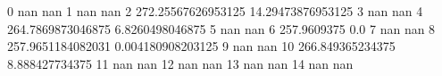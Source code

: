 0 nan nan
1 nan nan
2 272.25567626953125 14.29473876953125
3 nan nan
4 264.7869873046875 6.8260498046875
5 nan nan
6 257.9609375 0.0
7 nan nan
8 257.9651184082031 0.004180908203125
9 nan nan
10 266.849365234375 8.888427734375
11 nan nan
12 nan nan
13 nan nan
14 nan nan
